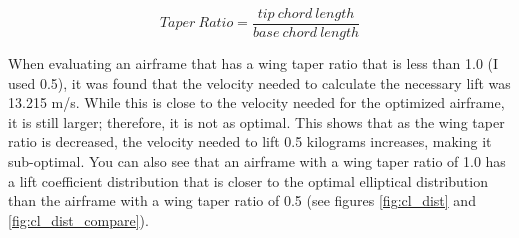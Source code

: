 \documentclass[journal]{new-aiaa}
\begin{document}
	\begin{equation}
		Taper\ Ratio = \frac{tip\ chord\ length}{base\ chord\ length}
		\label{eqn:taper-ratio}
	\end{equation}
	
	When evaluating an airframe that has a wing taper ratio that is less than 1.0 (I used 0.5), it was found that the velocity needed to calculate the necessary lift was 13.215 m/s. While this is close to the velocity needed for the optimized airframe, it is still larger; therefore, it is not as optimal. This shows that as the wing taper ratio is decreased, the velocity needed to lift 0.5 kilograms increases, making it sub-optimal. You can also see that an airframe with a wing taper ratio of 1.0 has a lift coefficient distribution that is closer to the optimal elliptical distribution than the airframe with a wing taper ratio of 0.5 (see figures \ref{fig:cl_dist} and \ref{fig:cl_dist_compare}).\\
	
\end{document}
